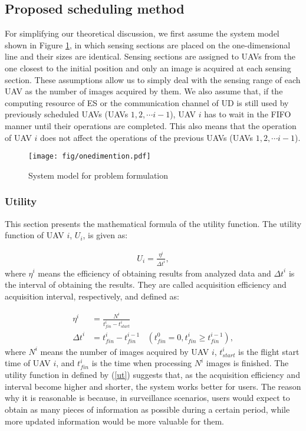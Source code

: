 \documentclass{ieeeaccess}
\begin{document}
\subsection{Proposed scheduling method}\label{math}
For simplifying our theoretical discussion, we first assume the system model shown in Figure \ref{model1.5}, in which sensing sections are placed on the one-dimensional line and their sizes are identical.
%
Sensing sections are assigned to UAVs from the one closest to the initial position and only an image is acquired at each sensing section.
%
These assumptions allow us to simply deal with the sensing range of each UAV as the number of images acquired by them.
%
We also assume that, if the computing resource of ES or the communication channel of UD is still used by previously scheduled UAVs (UAVs $1, 2, \cdots i-1$), UAV $i$ has to wait in the FIFO manner until their operations are completed.
%
This also means that the operation of UAV $i$ does not affect the operations of the previous UAVs (UAVs $1, 2, \cdots i-1$).

\begin{figure}[t]
\begin{center}
\texttt{[image: fig/onedimention.pdf]}
\caption{System model for problem formulation}
\label{model1.5}
\end{center}
\end{figure}

\subsubsection{Utility}\label{to}
This section presents the mathematical formula of the utility function.
%
The utility function of UAV $i$, $U_i$, is given as:

\begin{align}
U_i = \frac{\eta^i}{{\Delta{t}}^i}, \label{ut}
\end{align}
where $\eta^i$ means the efficiency of obtaining results from analyzed data and ${\Delta{t}}^i$ is the interval of obtaining the results.
%
They are called acquisition efficiency and acquisition interval, respectively, and defined as:

\begin{align}
\eta^i&=\frac{N^i}{{t_{fin}^i}-{t_{start}^i}} \label{f1}\\
{\Delta{t}}^i &= {t_{fin}^i}-t_{fin}^{i-1}~~~~(t_ {fin}^0=0, {t_{fin}^i}\geq{t_{fin}^{i-1}}), \label{f2}
\end{align}
where $N^i$ means the number of images acquired by UAV $i$, $t_{start}^i$ is the flight start time of UAV $i$, and $t_{fin}^i$ is the time when processing $N^i$ images is finished.
%
The utility function in defined by (\ref{ut}) suggests that, as the acquisition efficiency and interval become higher and shorter, the system works better for users.
%
The reason why it is reasonable is because, in surveillance scenarios, users would expect to obtain as many pieces of information as possible during a certain period, while more updated information would be more valuable for them.
\end{document}
